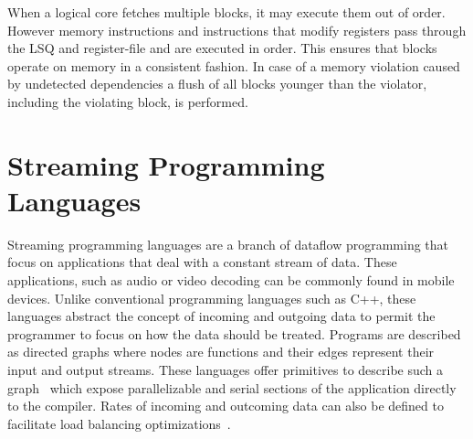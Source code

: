When a logical core fetches multiple blocks, it may execute them out of order.
However memory instructions and instructions that modify registers pass through the LSQ and register-file and are executed in order.
This ensures that blocks operate on memory in a consistent fashion.
In case of a memory violation caused by undetected dependencies a flush of all blocks younger than the violator, including the violating block, is performed.


\section{Streaming Programming Languages}


Streaming programming languages are a branch of dataflow programming that focus on applications that deal with a constant stream of data.
These applications, such as audio or video decoding can be commonly found in mobile devices.
Unlike conventional programming languages such as C++, these languages abstract the concept of incoming and outgoing data to permit the programmer to focus on how the data should be treated.
Programs are described as directed graphs where nodes are functions and their edges represent their input and output streams. 
These languages offer primitives to describe such a graph~\cite{theis2002streamit} which expose parallelizable and serial sections of the application directly to the compiler. 
Rates of incoming and outcoming data can also be defined to facilitate load balancing optimizations~\cite{chen2005rawstream}.

